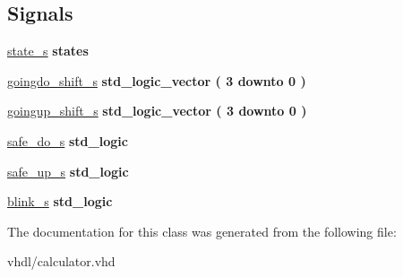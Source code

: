 \subsection*{Signals}
 \begin{DoxyCompactItemize}
\item 
\mbox{\label{classtrain__crossing_1_1rtl_a17a79c8d34e649e8b8cee04947ed297d}} 
\hyperlink{classtrain__crossing_1_1rtl_a17a79c8d34e649e8b8cee04947ed297d}{state\+\_\+s} {\bfseries \textcolor{vhdlchar}{states}\textcolor{vhdlchar}{ }} 
\item 
\mbox{\label{classtrain__crossing_1_1rtl_a85a2d965de2abd9ebea2cf36c88b2026}} 
\hyperlink{classtrain__crossing_1_1rtl_a85a2d965de2abd9ebea2cf36c88b2026}{goingdo\+\_\+shift\+\_\+s} {\bfseries \textcolor{vhdlchar}{std\+\_\+logic\+\_\+vector}\textcolor{vhdlchar}{ }\textcolor{vhdlchar}{(}\textcolor{vhdlchar}{ }\textcolor{vhdlchar}{ } \textcolor{vhdldigit}{3} \textcolor{vhdlchar}{ }\textcolor{vhdlchar}{downto}\textcolor{vhdlchar}{ }\textcolor{vhdlchar}{ } \textcolor{vhdldigit}{0} \textcolor{vhdlchar}{ }\textcolor{vhdlchar}{)}\textcolor{vhdlchar}{ }} 
\item 
\mbox{\label{classtrain__crossing_1_1rtl_a16417440ee61a857434422afd25d22af}} 
\hyperlink{classtrain__crossing_1_1rtl_a16417440ee61a857434422afd25d22af}{goingup\+\_\+shift\+\_\+s} {\bfseries \textcolor{vhdlchar}{std\+\_\+logic\+\_\+vector}\textcolor{vhdlchar}{ }\textcolor{vhdlchar}{(}\textcolor{vhdlchar}{ }\textcolor{vhdlchar}{ } \textcolor{vhdldigit}{3} \textcolor{vhdlchar}{ }\textcolor{vhdlchar}{downto}\textcolor{vhdlchar}{ }\textcolor{vhdlchar}{ } \textcolor{vhdldigit}{0} \textcolor{vhdlchar}{ }\textcolor{vhdlchar}{)}\textcolor{vhdlchar}{ }} 
\item 
\mbox{\label{classtrain__crossing_1_1rtl_a6bc7aed1ee539110dd3facb093e441db}} 
\hyperlink{classtrain__crossing_1_1rtl_a6bc7aed1ee539110dd3facb093e441db}{safe\+\_\+do\+\_\+s} {\bfseries \textcolor{vhdlchar}{std\+\_\+logic}\textcolor{vhdlchar}{ }} 
\item 
\mbox{\label{classtrain__crossing_1_1rtl_affbe8dcb5b9026c67369fd509e675c83}} 
\hyperlink{classtrain__crossing_1_1rtl_affbe8dcb5b9026c67369fd509e675c83}{safe\+\_\+up\+\_\+s} {\bfseries \textcolor{vhdlchar}{std\+\_\+logic}\textcolor{vhdlchar}{ }} 
\item 
\mbox{\label{classtrain__crossing_1_1rtl_a2bb6f6664fe116ea8474e0bfe2a0c8fc}} 
\hyperlink{classtrain__crossing_1_1rtl_a2bb6f6664fe116ea8474e0bfe2a0c8fc}{blink\+\_\+s} {\bfseries \textcolor{vhdlchar}{std\+\_\+logic}\textcolor{vhdlchar}{ }} 
\end{DoxyCompactItemize}


The documentation for this class was generated from the following file\+:\begin{DoxyCompactItemize}
\item 
vhdl/calculator.\+vhd\end{DoxyCompactItemize}
